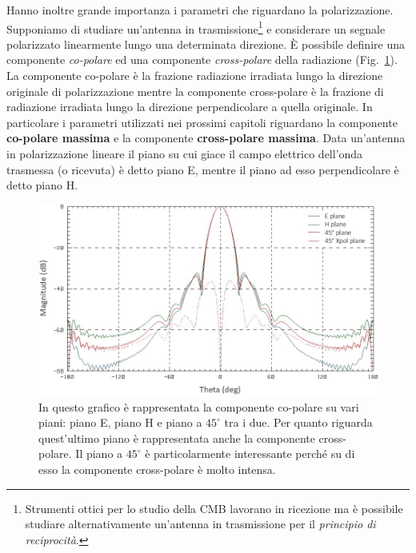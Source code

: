 \documentclass[12pt,a4paper,final]{book}
\begin{document}
Hanno inoltre grande importanza i parametri che riguardano la polarizzazione. Supponiamo di studiare un'antenna in trasmissione\footnote{Strumenti ottici per lo studio della CMB lavorano in ricezione ma è possibile studiare alternativamente un'antenna in trasmissione per il \textit{principio di reciprocità}.} e considerare un segnale polarizzato linearmente lungo una determinata direzione.
\`E possibile definire una componente \textit{co-polare} ed una componente \textit{cross-polare} della radiazione (Fig.~\ref{plane_cut}). La componente co-polare è la frazione radiazione irradiata lungo la direzione originale di polarizzazione mentre la componente cross-polare è la frazione di radiazione irradiata lungo la direzione perpendicolare a quella originale.
In particolare i parametri utilizzati nei prossimi capitoli riguardano la componente \textbf{co-polare massima} e la componente \textbf{cross-polare massima}. Data un'antenna in polarizzazione lineare il piano su cui giace il campo elettrico dell'onda trasmessa (o ricevuta) è detto piano E, mentre il piano ad esso perpendicolare è detto piano H.

\begin{figure}[!ht]
	\centering
	\includegraphics[width=\linewidth]{../figures/plane_cut.png}
	\caption{In questo grafico è rappresentata la componente co-polare su vari piani: piano E, piano H e piano a $45^{\circ}$ tra i due. Per quanto riguarda quest'ultimo piano è rappresentata anche la componente cross-polare. Il piano a $45^{\circ}$ è particolarmente interessante perché su di esso la componente cross-polare è molto intensa.}
	\label{plane_cut}
\end{figure}

\end{document}
